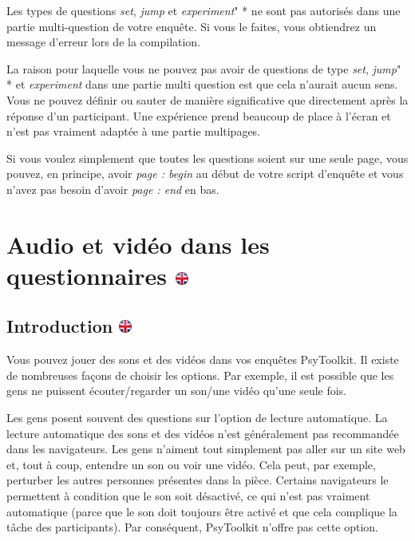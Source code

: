 \documentclass[
]{book}
\begin{document}
Les types de questions \emph{set}, \emph{jump} et \emph{experiment}" * ne sont pas autorisés dans une partie multi-question de votre enquête. Si vous le faites, vous obtiendrez un message d'erreur lors de la compilation.

La raison pour laquelle vous ne pouvez pas avoir de questions de type \emph{set}, \emph{jump}" * et \emph{experiment} dans une partie multi question est que cela n'aurait aucun sens. Vous ne pouvez définir ou sauter de manière significative que directement après la réponse d'un participant. Une expérience prend beaucoup de place à l'écran et n'est pas vraiment adaptée à une partie multipages.

Si vous voulez simplement que toutes les questions soient sur une seule page, vous pouvez, en principe, avoir \emph{page : begin} au début de votre script d'enquête et vous n'avez pas besoin d'avoir \emph{page : end} en bas.

\hypertarget{audio-et-viduxe9o-dans-les-questionnaires}{%
\chapter[Audio et vidéo dans les questionnaires ]{\texorpdfstring{Audio et vidéo dans les questionnaires \href{https://www.psytoolkit.org/lessons/surveyaudiovideo.html}{\protect\includegraphics{img/ukflag.png}}}{Audio et vidéo dans les questionnaires }}\label{audio-et-viduxe9o-dans-les-questionnaires}}

\hypertarget{introduction}{%
\section[Introduction ]{\texorpdfstring{Introduction \href{https://www.psytoolkit.org/lessons/surveyaudiovideo.html\#_introduction}{\protect\includegraphics{img/ukflag.png}}}{Introduction }}\label{introduction}}

Vous pouvez jouer des sons et des vidéos dans vos enquêtes PsyToolkit. Il existe de nombreuses façons de choisir les options. Par exemple, il est possible que les gens ne puissent écouter/regarder un son/une vidéo qu'une seule fois.

Les gens posent souvent des questions sur l'option de lecture automatique. La lecture automatique des sons et des vidéos n'est généralement pas recommandée dans les navigateurs. Les gens n'aiment tout simplement pas aller sur un site web et, tout à coup, entendre un son ou voir une vidéo. Cela peut, par exemple, perturber les autres personnes présentes dans la pièce. Certains navigateurs le permettent à condition que le son soit désactivé, ce qui n'est pas vraiment automatique (parce que le son doit toujours être activé et que cela complique la tâche des participants). Par conséquent, PsyToolkit n'offre pas cette option.
\end{document}

